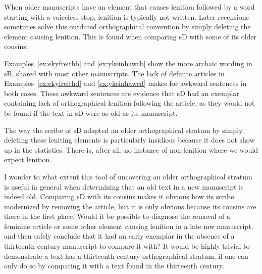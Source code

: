 When older manuscripts have an element that causes lenition followed by a word starting with a voiceless stop, lenition is typically not written. Later recensions sometimes solve this outdated orthographical convention by simply deleting the element causing lenition. This is found when comparing \gls{sD} with some of its older cousins:
\begin{mwl}
\end{mwl}
Examples~\ref{ex:ekyfreithb} and \ref{ex:ykeinhawcb} show the more archaic wording in \gls{sB}, shared with most other manuscripts. The lack of definite articles in Examples~\ref{ex:ekyfreithd} and \ref{ex:ykeinhawcd} makes for awkward sentences in both cases. These awkward sentences are evidence that \gls{sD} had an exemplar containing lack of orthographical lenition following the article, as they would not be found if the text in \gls{sD} were as old as its manuscript.

The way the scribe of \gls{sD} adapted an older orthographical stratum by simply deleting these leniting elements is particularly insidious because it does not show up in the statistics. There is, after all, no instance of non-lenition where we would expect lenition.

I wonder to what extent this tool of uncovering an older orthographical stratum is useful in general when determining that an old text in a new manuscript is indeed old. Comparing \gls{sD} with its cousins makes it obvious how its scribe modernized by removing the article, but it is only obvious because its cousins are there in the first place. Would it be possible to diagnose the removal of a feminine article or some other element causing lenition in a late \gls{mw} manuscript, and then safely conclude that it had an early exemplar in the absence of a thirteenth-century manuscript to compare it with? It would be highly trivial to demonstrate a text has a thirteenth-century orthographical stratum, if one can only do so by comparing it with a text found in the thirteenth century.
